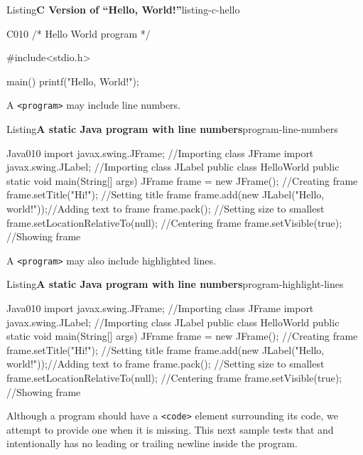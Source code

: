 \documentclass[pdflatex]{sn-jnl}
\theoremstyle{thmstyleone}%
\theoremstyle{thmstyletwo}%
\theoremstyle{thmstylethree}%
\newcommand{\mono}[1]{\texttt{#1}}
\numberwithin{equation}{section}
\begin{document}
\begin{listingptx}{Listing}{\textbf{C Version of ``Hello, World!''}}{listing-c-hello}{}%
\begin{program}{C}{0}{1}{0}
/* Hello World program */

#include<stdio.h>

main()
{
    printf("Hello, World!");
}
\end{program}
\end{listingptx}%
A \mono{<program>} may include line numbers.%
\begin{listingptx}{Listing}{\textbf{A static Java program with line numbers}}{program-line-numbers}{}%
\begin{programnumbered}{Java}{0}{1}{0}
import javax.swing.JFrame;  //Importing class JFrame
import javax.swing.JLabel;  //Importing class JLabel
public class HelloWorld {
    public static void main(String[] args) {
        JFrame frame = new JFrame();           //Creating frame
        frame.setTitle("Hi!");                 //Setting title frame
        frame.add(new JLabel("Hello, world!"));//Adding text to frame
        frame.pack();                          //Setting size to smallest
        frame.setLocationRelativeTo(null);     //Centering frame
        frame.setVisible(true);                //Showing frame
    }
}
\end{programnumbered}
\end{listingptx}%
A \mono{<program>} may also include highlighted lines.%
\begin{listingptx}{Listing}{\textbf{A static Java program with line numbers}}{program-highlight-lines}{}%
\begin{programnumbered}{Java}{0}{1}{0}
import javax.swing.JFrame;  //Importing class JFrame
import javax.swing.JLabel;  //Importing class JLabel
public class HelloWorld {
    public static void main(String[] args) {
        JFrame frame = new JFrame();           //Creating frame
        frame.setTitle("Hi!");                 //Setting title frame
        frame.add(new JLabel("Hello, world!"));//Adding text to frame
        frame.pack();                          //Setting size to smallest
        frame.setLocationRelativeTo(null);     //Centering frame
        frame.setVisible(true);                //Showing frame
    }
}
\end{programnumbered}
\end{listingptx}%
Although a program should have a \mono{<code>} element surrounding its code, we attempt to provide one when it is missing. This next sample tests that and intentionally has no leading or trailing newline inside the program.%
\end{document}
